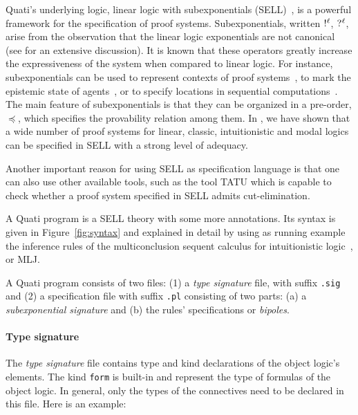 \documentclass{llncs}
\newcommand{\nbang}[1]{\hbox{$!^{#1}$}}
\newcommand{\nquest}[1]{\hbox{$?^{#1}$}}
\begin{document}
Quati's underlying logic, linear logic with subexponentials
(SELL)~\cite{nigam09ppdp}, is a powerful framework for the specification of proof systems. 
Subexponentials, written $\nbang{\ell}$, $\nquest{\ell}$, arise from the
observation that the linear logic exponentials are not canonical (see
\cite{nigam.jlc} for an extensive discussion). It is known that these operators
greatly increase
the expressiveness of the system when compared to linear logic. For instance,
subexponentials can be used to represent contexts of proof
systems~\cite{nigam.jlc}, to mark the epistemic state of
agents~\cite{nigam12lics}, or to specify locations in sequential
computations~\cite{nigam09ppdp}. 
The main feature of subexponentials is that they can be organized in a pre-order, $\preceq$, which specifies
the provability relation among them. 
In \cite{nigam.jlc}, we have shown that a wide number of proof systems for linear, classic, intuitionistic and 
modal logics can be specified in SELL with a strong level of adequacy. 

Another important reason for using SELL as specification language is that one can also use 
other available tools, such as the tool TATU which is capable to check whether a proof system 
specified in SELL admits cut-elimination.

A Quati program is a SELL theory with some more annotations. Its syntax is given
in Figure~\ref{fig:syntax} and explained in detail  
by using as running example the inference rules of the multiconclusion sequent
calculus for intuitionistic logic~\cite{maehara54nmj}, or MLJ.

A Quati program consists of two files: (1) a \emph{type signature} file, with
suffix \texttt{.sig} and (2) a specification file with suffix \texttt{.pl} consisting of two parts: (a) a
\emph{subexponential signature} and (b) the rules' specifications or
\emph{bipoles}.

\vspace{-2mm}

\paragraph{Type signature}
%
The \emph{type signature} file contains type and kind declarations of the object
logic's elements. The kind \texttt{form} is built-in and
represent the type of formulas of the object logic. In general, only
the types of the connectives need to be declared in this file. Here is an
example:
\vspace{-1mm}
\end{document}
